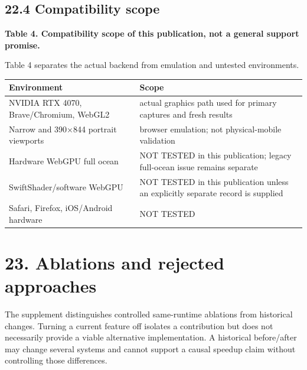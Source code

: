 \documentclass[
  english,
  11pt,
]{article}
\newcounter{none} %
\begin{document}
\subsection{22.4 Compatibility scope}\label{compatibility-scope}

\textbf{Table 4. Compatibility scope of this publication, not a general
support promise.}

Table 4 separates the actual backend from emulation and untested
environments.

{\def\LTcaptype{none} %
\begin{longtable}[]{@{}
  >{\raggedright\arraybackslash}p{}
  >{\raggedright\arraybackslash}p{}@{}}
\toprule\noalign{}
\begin{minipage}[b]{\linewidth}\raggedright
Environment
\end{minipage} & \begin{minipage}[b]{\linewidth}\raggedright
Scope
\end{minipage} \\
\midrule\noalign{}
\endhead
\bottomrule\noalign{}
\endlastfoot
NVIDIA RTX 4070, Brave/Chromium, WebGL2 & actual graphics path used for
primary captures and fresh results \\
Narrow and 390×844 portrait viewports & browser emulation; not
physical-mobile validation \\
Hardware WebGPU full ocean & NOT TESTED in this publication; legacy
full-ocean issue remains separate \\
SwiftShader/software WebGPU & NOT TESTED in this publication unless an
explicitly separate record is supplied \\
Safari, Firefox, iOS/Android hardware & NOT TESTED \\
\end{longtable}
}

\section{23. Ablations and rejected
approaches}\label{ablations-and-rejected-approaches}

The supplement distinguishes controlled same-runtime ablations from
historical changes. Turning a current feature off isolates a
contribution but does not necessarily provide a viable alternative
implementation. A historical before/after may change several systems and
cannot support a causal speedup claim without controlling those
differences.
\end{document}
